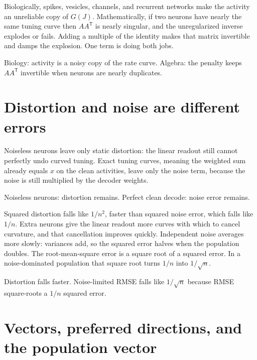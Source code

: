 \documentclass[11pt,letterpaper]{article}
\newcommand{\ans}[1]{\par\vspace{2pt}{\bfseries #1}\quad}
\begin{document}
\ans{2.}
Biologically, spikes, vesicles, channels, and recurrent networks make the activity an unreliable copy of \(G(J)\). Mathematically, if two neurons have nearly the same tuning curve then \(AA^{\mathsf{T}}\) is nearly singular, and the unregularized inverse explodes or fails. Adding a multiple of the identity makes that matrix invertible and damps the explosion. One term is doing both jobs.
\begin{result}
Biology: activity is a noisy copy of the rate curve. Algebra: the penalty keeps \(AA^{\mathsf{T}}\) invertible when neurons are nearly duplicates.
\end{result}

\section{Distortion and noise are different errors}

\ans{1.}
Noiseless neurons leave only static distortion: the linear readout still cannot perfectly undo curved tuning. Exact tuning curves, meaning the weighted sum already equals \(x\) on the clean activities, leave only the noise term, because the noise is still multiplied by the decoder weights.
\begin{result}
Noiseless neurons: distortion remains. Perfect clean decode: noise error remains.
\end{result}

\ans{2.}
Squared distortion falls like \(1/n^2\), faster than squared noise error, which falls like \(1/n\). Extra neurons give the linear readout more curves with which to cancel curvature, and that cancellation improves quickly. Independent noise averages more slowly: variances add, so the squared error halves when the population doubles. The root-mean-square error is a square root of a squared error. In a noise-dominated population that square root turns \(1/n\) into \(1/\sqrt{n}\).
\begin{result}
Distortion falls faster. Noise-limited RMSE falls like \(1/\sqrt{n}\) because RMSE square-roots a \(1/n\) squared error.
\end{result}

\section{Vectors, preferred directions, and the population vector}
\end{document}
